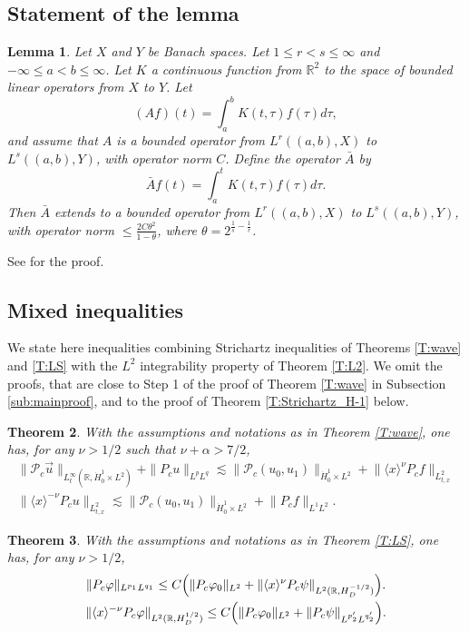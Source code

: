 \documentclass[10pt,leqno]{amsart}
\newtheorem{theorem}{Theorem}[section]
\newtheorem{lemma}[theorem]{Lemma}
\theoremstyle{definition}%
\theoremstyle{remark}
\numberwithin{equation}{section}
\newcommand{\R}{\mathbb{R}}
\renewcommand{\^}{\widehat}%
\newcommand{\PPP}{\mathcal{P}}
\begin{document}
\subsection{Statement of the lemma}
\begin{lemma}
\label{L:ChristKiselev}
Let $X$ and $Y$ be Banach spaces. 
 Let $1\leq r<s\leq \infty$ and $-\infty\leq a<b\leq \infty$. Let $K$ a continuous function from $\R^2$ to the space of bounded linear operators from $X$ to $Y$. Let
 $$ (A f)(t)=\int_a^b K(t,\tau)f(\tau)d\tau,$$
 and assume that $A$ is a  bounded operator from $L^r((a,b),X)$ to $L^s((a,b),Y)$, with operator norm $C$. Define the operator $\bar{A}$ by
 $$\bar{A} f(t)=\int_a^t K(t,\tau)f(\tau)d\tau.$$
 Then $\bar{A}$ extends to a bounded operator from $L^r((a,b),X)$ to $L^s((a,b),Y)$, with operator norm $\leq \frac{2C\theta^2}{1-\theta}$, where $\theta=2^{\frac 1s-\frac 1r}$.
\end{lemma}
See \cite[Proof of Lemma 3.1]{SmithSogge00} for the proof.
\subsection{Mixed inequalities}
\label{AA:mixed}
We state here inequalities combining Strichartz inequalities of Theorems \ref{T:wave} and \ref{T:LS} with the $L^2$ integrability property of Theorem \ref{T:L2}. We omit the proofs, that are close to Step 1 of the proof of Theorem \ref{T:wave} in Subsection \ref{sub:mainproof}, and to the proof of Theorem \ref{T:Strichartz_H-1} below.
\begin{theorem}
With the assumptions and notations as in Theorem \ref{T:wave}, one has, for any $\nu>1/2$ such that $\nu+\alpha>7/2$,
\begin{gather}
\label{mixed_wave_1}
\|\PPP_c\vec{u}\|_{L^{\infty}_t(\R,\dot{H}^1_0\times L^{2})}+\|P_c u\|_{L^pL^q}\lesssim \lVert \PPP_c(u_0,u_1)\rVert_{\dot{ H}^1_0\times L^2}+\lVert \langle x\rangle^\nu P_c f\rVert_{L^2_{t,x}}\\
\label{mixed_wave_2}
\|\langle x\rangle^{-\nu}P_c u\|_{L^2_{t,x}}\lesssim \lVert \PPP_c(u_0,u_1)\rVert_{\dot{ H}^1_0\times L^2}+\lVert P_c f\rVert_{L^1L^2}.
\end{gather} 
\end{theorem}
\begin{theorem}
With the assumptions and notations as in Theorem \ref{T:LS}, one has, for any $\nu>1/2$,
\begin{gather}
	\label{mixed_LS_1}
	\|P_c \varphi\|_{L^{p_1}L^{q_1}}\le C\Bigl(\|P_c\varphi_0\|_{L^2}+\|\langle x\rangle^{\nu}P_c \psi\|_{L^{2}(\R,H^{-1/2}_D)}\Bigr).\\
	\label{mixed_LS_2}
\|\langle x\rangle^{-\nu}P_c \varphi\|_{L^{2}(\R,H^{1/2}_D)}\le C\Bigl(\|P_c\varphi_0\|_{L^2}+\|P_c \psi\|_{L^{p_2'}L^{q_2'}}\Bigr).\end{gather}
\end{theorem}
\end{document}
